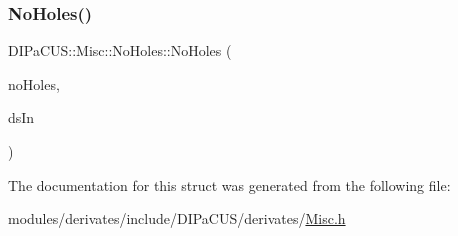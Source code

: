 \subsubsection{\texorpdfstring{No\+Holes()}{NoHoles()}}
{\footnotesize\ttfamily D\+I\+Pa\+C\+U\+S\+::\+Misc\+::\+No\+Holes\+::\+No\+Holes (\begin{DoxyParamCaption}\item[{\mbox{\hyperlink{structDIPaCUS_1_1Misc_1_1NoHoles_aea4bec251425e3c31593c97ec33a9dda}{Digital\+Set}} \&}]{no\+Holes,  }\item[{const \mbox{\hyperlink{structDIPaCUS_1_1Misc_1_1NoHoles_aea4bec251425e3c31593c97ec33a9dda}{Digital\+Set}} \&}]{ds\+In }\end{DoxyParamCaption})}



The documentation for this struct was generated from the following file\+:\begin{DoxyCompactItemize}
\item 
modules/derivates/include/\+D\+I\+Pa\+C\+U\+S/derivates/\mbox{\hyperlink{Misc_8h}{Misc.\+h}}\end{DoxyCompactItemize}
